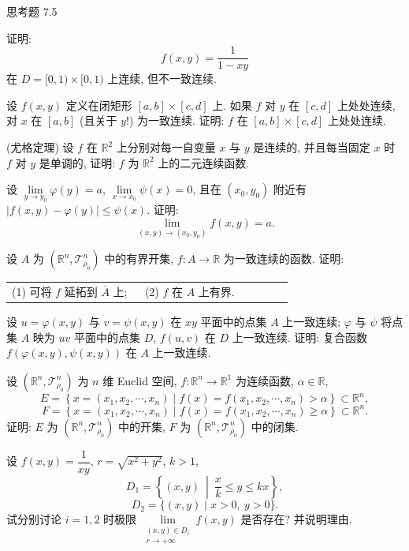 \begin{exblock}{思考题 7.5}
  \item 证明:
  \[
    f(x, y) = \frac{1}{1 - xy}
  \]
  在 $D = [0, 1) \times [0, 1)$ 上连续, 但不一致连续.

  \item 设 $f(x, y)$ 定义在闭矩形 $[a, b] \times [c, d]$ 上. 如果 $f$ 对 $y$ 在 $[c, d]$ 上处处连续, 对 $x$ 在 $[a, b]$ (且关于 $y$!) 为一致连续. 证明: $f$ 在 $[a, b] \times [c, d]$ 上处处连续.

  \item (尤格定理) 设 $f$ 在 $\mathbb{R}^{2}$ 上分别对每一自变量 $x$ 与 $y$ 是连续的, 并且每当固定 $x$ 时 $f$ 对 $y$ 是单调的, 证明: $f$ 为 $\mathbb{R}^{2}$ 上的二元连续函数.

  \item 设 $\lim\limits_{y \to y_{0}} \varphi(y) = a$, $\lim\limits_{x \to x_{0}} \psi(x) = 0$, 且在 $(x_{0}, y_{0})$ 附近有 $|f(x, y) - \varphi(y)| \leqslant \psi(x)$. 证明:
  \[
    \lim_{(x, y) \to (x_{0}, y_{0})} f(x, y) = a.
  \]

  \item 设 $A$ 为 $(\mathbb{R}^{n}, \mathcal{T}_{\rho_{0}}^{n})$ 中的有界开集, $f\colon A \to \mathbb{R}$ 为一致连续的函数. 证明:

  \begin{tabular}{@{}p{0.45\linewidth}p{0.50\linewidth}@{}}
    (1) 可将 $f$ 延拓到 $\overline{A}$ 上; & (2) $f$ 在 $A$ 上有界.
  \end{tabular}

  \item 设 $u = \varphi(x, y)$ 与 $v = \psi(x, y)$ 在 $xy$ 平面中的点集 $A$ 上一致连续; $\varphi$ 与 $\psi$ 将点集 $A$ 映为 $uv$ 平面中的点集 $D$, $f(u, v)$ 在 $D$ 上一致连续. 证明: 复合函数 $f(\varphi(x, y), \psi(x, y))$ 在 $A$ 上一致连续.

  \item 设 $(\mathbb{R}^{n}, \mathcal{T}_{\rho_{0}}^{n})$ 为 $n$ 维 Euclid 空间, $f\colon \mathbb{R}^{n} \to \mathbb{R}^{1}$ 为连续函数, $\alpha \in \mathbb{R}$,
  \[
    E = \left\{x = (x_{1}, x_{2}, \cdots, x_{n}) \mid f(x) = f(x_{1}, x_{2}, \cdots, x_{n}) > \alpha\right\} \subset \mathbb{R}^{n},
  \]
  \[
    F = \left\{x = (x_{1}, x_{2}, \cdots, x_{n}) \mid f(x) = f(x_{1}, x_{2}, \cdots, x_{n}) \geqslant \alpha\right\} \subset \mathbb{R}^{n}.
  \]
  证明: $E$ 为 $(\mathbb{R}^{n}, \mathcal{T}_{\rho_{0}}^{n})$ 中的开集, $F$ 为 $(\mathbb{R}^{n}, \mathcal{T}_{\rho_{0}}^{n})$ 中的闭集.

  \item 设 $f(x, y) = \dfrac{1}{xy}$, $r = \sqrt{x^{2} + y^{2}}$, $k > 1$,
  \[
    D_{1} = \left\{(x, y)\ \middle|\ \frac{x}{k} \leqslant y \leqslant kx\right\},
  \]
  \[
    D_{2} = \{(x, y) \mid x > 0,\ y > 0\}.
  \]
  试分别讨论 $i = 1, 2$ 时极限 $\lim\limits_{\substack{(x, y) \in D_{i} \\ r \to +\infty}} f(x, y)$ 是否存在? 并说明理由.


\end{exblock}
